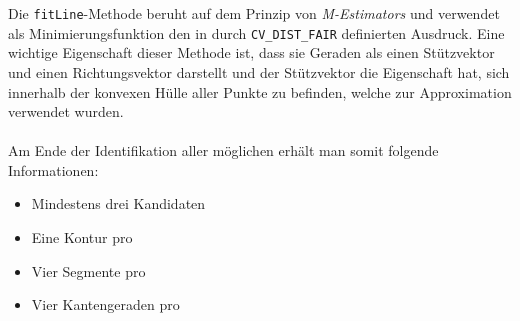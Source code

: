 Die \texttt{fitLine}-Methode beruht auf dem Prinzip von \emph{M-Estimators} und verwendet als Minimierungsfunktion den in \OpenCV durch \texttt{CV\_DIST\_FAIR} definierten Ausdruck. Eine wichtige Eigenschaft dieser Methode ist, dass sie Geraden als einen Stützvektor und einen Richtungsvektor darstellt und der Stützvektor die Eigenschaft hat, sich innerhalb der konvexen Hülle aller Punkte zu befinden, welche zur Approximation verwendet wurden.
\\\\
Am Ende der Identifikation aller möglichen \fps erhält man somit folgende Informationen:
\begin{itemize}
	\item Mindestens drei \fp Kandidaten
	\item Eine Kontur pro \fp
	\item Vier Segmente pro \fp
	\item Vier Kantengeraden pro \fp
\end{itemize}